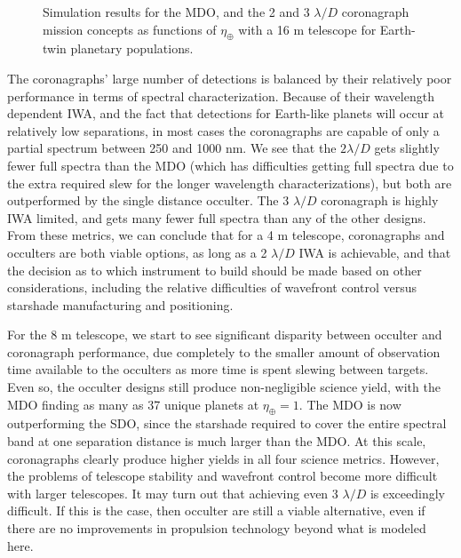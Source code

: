 \begin{figure}[ht]
\begin{center}
\begin{tabular}{c c}
  \end{tabular}
 \end{center}
 \caption[16 m telescope comparison]{ \label{fig:compinsts16m} Simulation results for the MDO, and the 2 and 3 $\lambda/D$ coronagraph mission concepts as functions of $\eta_\oplus$ with a 16 m telescope for Earth-twin planetary populations.}
 \end{figure}

The coronagraphs' large number of detections is balanced by their relatively poor performance in terms of spectral characterization.  Because of their wavelength dependent IWA, and the fact that detections for Earth-like planets will occur at relatively low separations\cite{brown2005}, in most cases the coronagraphs are capable of only a partial spectrum between 250 and 1000 nm.  We see that the $2\lambda/D$ gets slightly fewer full spectra than the MDO (which has difficulties getting full spectra due to the extra required slew for the longer wavelength characterizations), but both are outperformed by the single distance occulter.  The 3 $\lambda/D$ coronagraph is highly IWA limited, and gets many fewer full spectra than any of the other designs.  From these metrics, we can conclude that for a 4 m telescope, coronagraphs and occulters are both viable options, as long as a 2 $\lambda/D$ IWA is achievable, and that the decision as to which instrument to build should be made based on other considerations, including the relative difficulties of wavefront control versus starshade manufacturing and positioning.
 
 For the 8 m telescope, we start to see significant disparity between occulter and coronagraph performance, due completely to the smaller amount of observation time available to the occulters as more time is spent slewing between targets.  Even so, the occulter designs still produce non-negligible science yield, with the MDO finding as many as 37 unique planets at $\eta_\oplus = 1$.  The MDO is now outperforming the SDO, since the starshade required to cover the entire spectral band at one separation distance is much larger than the MDO.  At this scale, coronagraphs clearly produce higher yields in all four science metrics.  However, the problems of telescope stability and wavefront control become more difficult with larger telescopes.  It may turn out that achieving even 3 $\lambda/D$ is exceedingly difficult.  If this is the case, then occulter are still a viable alternative, even if there are no improvements in propulsion technology beyond what is modeled here.
 
